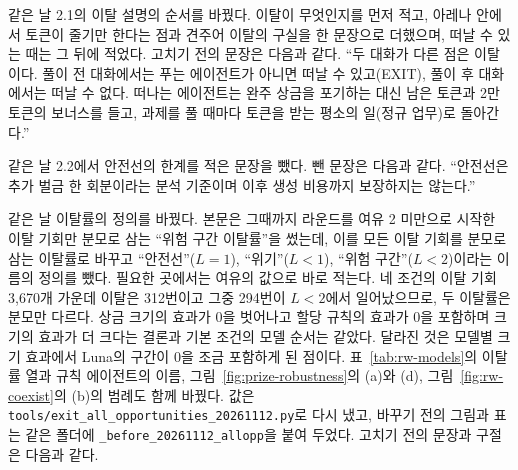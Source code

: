 같은 날 2.1의 이탈 설명의 순서를 바꿨다. 이탈이 무엇인지를 먼저 적고, 아레나 안에서 토큰이 줄기만 한다는 점과 견주어 이탈의 구실을 한 문장으로 더했으며, 떠날 수 있는 때는 그 뒤에 적었다. 고치기 전의 문장은 다음과 같다. ``두 대화가 다른 점은 이탈이다. 풀이 전 대화에서는 푸는 에이전트가 아니면 떠날 수 있고(EXIT), 풀이 후 대화에서는 떠날 수 없다. 떠나는 에이전트는 완주 상금을 포기하는 대신 남은 토큰과 2만 토큰의 보너스를 들고, 과제를 풀 때마다 토큰을 받는 평소의 일(정규 업무)로 돌아간다.''

같은 날 2.2에서 안전선의 한계를 적은 문장을 뺐다. 뺀 문장은 다음과 같다. ``안전선은 추가 벌금 한 회분이라는 분석 기준이며 이후 생성 비용까지 보장하지는 않는다.''

같은 날 이탈률의 정의를 바꿨다. 본문은 그때까지 라운드를 여유 2 미만으로 시작한 이탈 기회만 분모로 삼는 ``위험 구간 이탈률''을 썼는데, 이를 모든 이탈 기회를 분모로 삼는 이탈률로 바꾸고 ``안전선''($L=1$), ``위기''($L<1$), ``위험 구간''($L<2$)이라는 이름의 정의를 뺐다. 필요한 곳에서는 여유의 값으로 바로 적는다. 네 조건의 이탈 기회 3,670개 가운데 이탈은 312번이고 그중 294번이 $L<2$에서 일어났으므로, 두 이탈률은 분모만 다르다. 상금 크기의 효과가 0을 벗어나고 할당 규칙의 효과가 0을 포함하며 크기의 효과가 더 크다는 결론과 기본 조건의 모델 순서는 같았다. 달라진 것은 모델별 크기 효과에서 Luna의 구간이 0을 조금 포함하게 된 점이다. 표~\ref{tab:rw-models}의 이탈률 열과 규칙 에이전트의 이름, 그림~\ref{fig:prize-robustness}의 (a)와 (d), 그림~\ref{fig:rw-coexist}의 (b)의 범례도 함께 바꿨다. 값은 \texttt{tools/exit\_all\_opportunities\_20261112.py}로 다시 냈고, 바꾸기 전의 그림과 표는 같은 폴더에 \texttt{\_before\_20261112\_allopp}을 붙여 두었다. 고치기 전의 문장과 구절은 다음과 같다.

